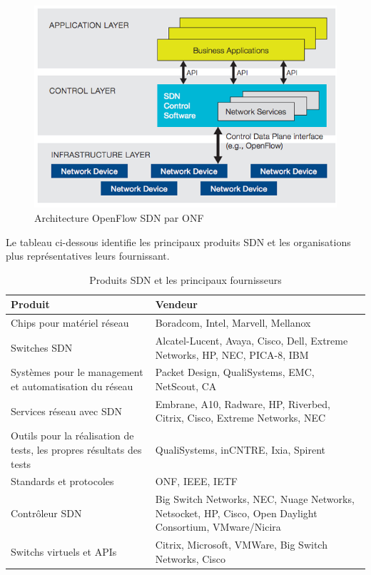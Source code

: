 \begin{figure}[!h] %
\includegraphics[width=15cm]{images/openflowArchi.png} %
\caption{ Architecture OpenFlow SDN par ONF \cite{SDNNewNormONFExecutiveSummary}} %
\label{imgArchi} %
\end{figure} %
 
Le tableau ci-dessous identifie les principaux produits SDN et les organisations plus représentatives leurs fournissant.

\begin{table}[!h]
\centering
\begin{tabular}{|p{6cm}|p{9cm}|}
\hline 
\bf Produit & \bf Vendeur \\ 
\hline 
Chips pour matériel réseau & Boradcom, Intel, Marvell, Mellanox \\ 
\hline 
Switches SDN & Alcatel-Lucent, Avaya, Cisco, Dell, Extreme Networks, HP, NEC, PICA-8, IBM \\ 
\hline 
Systèmes pour le management et automatisation du réseau & Packet Design, QualiSystems, EMC, NetScout, CA \\ 
\hline 
Services réseau avec SDN & Embrane, A10, Radware, HP, Riverbed, Citrix, Cisco,  Extreme Networks, NEC \\ 
\hline 
Outils pour la réalisation de tests, les propres résultats des tests & QualiSystems, inCNTRE, Ixia, Spirent \\ 
\hline 
Standards et protocoles & ONF, IEEE, IETF \\ 
\hline 
Contrôleur SDN & Big Switch Networks, NEC, Nuage Networks, Netsocket, HP, Cisco, Open Daylight Consortium, VMware/Nicira \\ 
\hline 
Switchs virtuels et APIs & Citrix, Microsoft, VMWare, Big Switch Networks, Cisco \\ 
\hline 
\end{tabular} 
\caption{Produits SDN et les principaux fournisseurs \cite{2013GuideSDNNVEcosystem}}
\end{table} 
 
